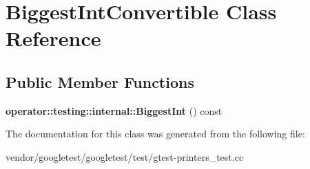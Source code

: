 \hypertarget{class_biggest_int_convertible}{}\section{Biggest\+Int\+Convertible Class Reference}
\label{class_biggest_int_convertible}
\subsection*{Public Member Functions}
\begin{DoxyCompactItemize}
\item 
\mbox{\label{class_biggest_int_convertible_aa3dc4bbff87d412758b9adbefa19c6d0}} 
{\bfseries operator\+::testing\+::internal\+::\+Biggest\+Int} () const
\end{DoxyCompactItemize}


The documentation for this class was generated from the following file\+:\begin{DoxyCompactItemize}
\item 
vendor/googletest/googletest/test/gtest-\/printers\+\_\+test.\+cc\end{DoxyCompactItemize}
